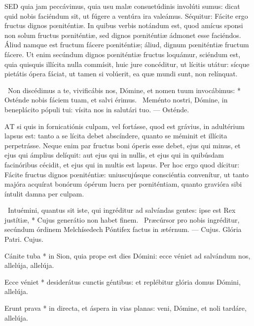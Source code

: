 
\lettrine[lines=2]{S}{ED} quia jam peccávimus, quia usu malæ consuetúdinis involúti sumus: dicat quid nobis faciéndum sit, ut fúgere a ventúra ira valeámus. Séquitur: Fácite ergo fructus dignos pœniténtiæ. In quibus verbis notándum est, quod amícus sponsi non solum fructus pœniténtiæ, sed dignos pœniténtiæ ádmonet esse faciéndos. Áliud namque est fructum fácere pœniténtiæ; áliud, dignum pœniténtiæ fructum fácere. Ut enim secúndum dignos pœniténtiæ fructus loquámur, sciéndum est, quia quisquis illícita nulla commísit, huic jure concéditur, ut lícitis utátur: sícque pietátis ópera fáciat, ut tamen si volúerit, ea quæ mundi sunt, non relínquat.

\R\ Non discédimus a te, vivificábis nos, Dómine, et nomen tuum invocábimus: * Osténde nobis fáciem tuam, et salvi érimus. \V\ Meménto nostri, Dómine, in beneplácito pópuli tui: vísita nos in salutári tuo. --- Osténde.


\lettrine[lines=2]{A}{T} si quis in fornicatiónis culpam, vel fortásse, quod est grávius, in adultérium lapsus est: tanto a se lícita debet abscíndere, quanto se méminit et illícita perpetrásse. Neque enim par fructus boni óperis esse debet, ejus qui minus, et ejus qui ámplius delíquit: aut ejus qui in nullis, et ejus qui in quibúsdam facinóribus cécidit, et ejus qui in multis est lapsus. Per hoc ergo quod dícitur: Fácite fructus dignos pœniténtiæ: uniuscujúsque consciéntia convenítur, ut tanto majóra acquírat bonórum ópérum lucra per pœniténtiam, quanto gravióra sibi íntulit damna per culpam.

\R\ Intuémini, quantus sit iste, qui ingréditur ad salvándas gentes: ipse est Rex justítiæ, * Cujus generátio non habet finem. \V\ Præcúrsor pro nobis ingréditur, secúndum órdinem Melchísedech Póntifex factus in ætérnum. --- Cujus. Glória Patri. Cujus.



 Cánite tuba * in Sion, quia prope est dies Dómini: ecce véniet ad salvándum nos, allelúja, allelúja.


 Ecce véniet * desiderátus cunctis géntibus: et replébitur glória domus Dómini, allelúja.

 Erunt prava * in directa, et áspera in vias planas: veni, Dómine, et noli tardáre, allelúja.

